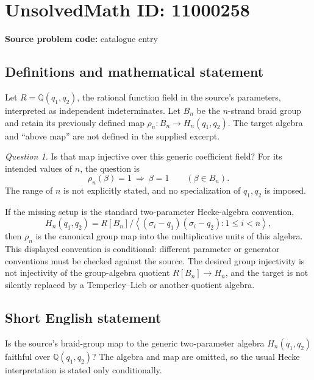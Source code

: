 \documentclass[11pt]{article}
\newcommand{\Q}{\mathbb{Q}}
\begin{document}
\section*{UnsolvedMath ID: 11000258}
\textbf{Source problem code:} catalogue entry
\subsection{Definitions and mathematical statement}
Let \(R=\Q(q_1,q_2)\), the rational function field in the source's parameters, interpreted as independent indeterminates. Let \(B_n\) be the \(n\)-strand braid group and retain its previously defined map \(\rho_n:B_n\to H_n(q_1,q_2)\). The target algebra and ``above map'' are not defined in the supplied excerpt.

\emph{Question 1.} Is that map injective over this generic coefficient field? For its intended values of \(n\), the question is
\[
 \rho_n(\beta)=1\ \Longrightarrow\ \beta=1
 \qquad(\beta\in B_n).
\]
The range of \(n\) is not explicitly stated, and no specialization of \(q_1,q_2\) is imposed.

If the missing setup is the standard two-parameter Hecke-algebra convention,
\[
 H_n(q_1,q_2)=R[B_n]/
 \left\langle(\sigma_i-q_1)(\sigma_i-q_2):1\leq i<n\right\rangle,
\]
then \(\rho_n\) is the canonical group map into the multiplicative units of this algebra. This displayed convention is conditional: different parameter or generator conventions must be checked against the source. The desired group injectivity is not injectivity of the group-algebra quotient \(R[B_n]\to H_n\), and the target is not silently replaced by a Temperley--Lieb or another quotient algebra.
\subsection{Short English statement}
Is the source's braid-group map to the generic two-parameter algebra \(H_n(q_1,q_2)\) faithful over \(\Q(q_1,q_2)\)? The algebra and map are omitted, so the usual Hecke interpretation is stated only conditionally.
\end{document}
